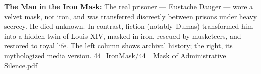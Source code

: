 \begin{SideNotePage}{
  \textbf{The Man in the Iron Mask:}  
  The real prisoner — Eustache Dauger — wore a velvet mask, not iron, and was transferred discreetly between prisons under heavy secrecy. He died unknown. In contrast, fiction (notably Dumas) transformed him into a hidden twin of Louis XIV, masked in iron, rescued by musketeers, and restored to royal life. The left column shows archival history; the right, its mythologized media version.
}{44_IronMask/44_ Mask of Administrative Silence.pdf}
\end{SideNotePage}
